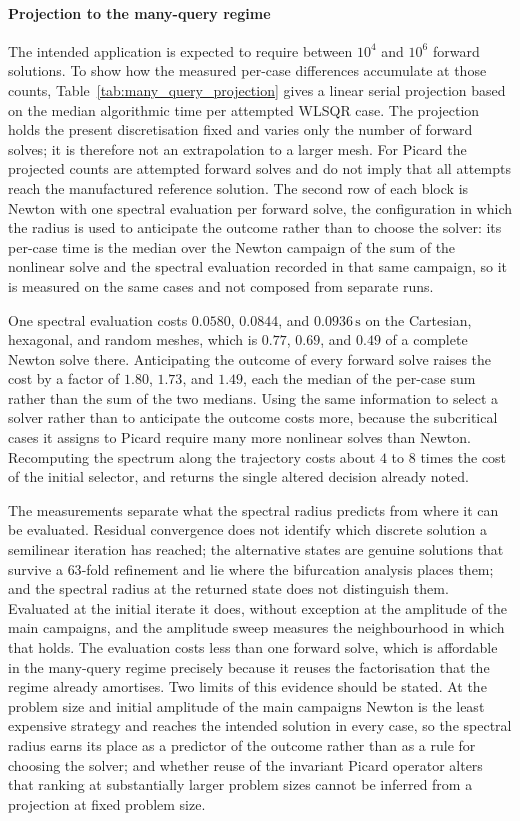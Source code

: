 \paragraph{Projection to the many-query regime}
The intended application is expected to require between $10^{4}$ and $10^{6}$ forward solutions. To show how the measured per-case differences accumulate at those counts, Table~\ref{tab:many_query_projection} gives a linear serial projection based on the median algorithmic time per attempted WLSQR case. The projection holds the present discretisation fixed and varies only the number of forward solves; it is therefore not an extrapolation to a larger mesh. For Picard the projected counts are attempted forward solves and do not imply that all attempts reach the manufactured reference solution. The second row of each block is Newton with one spectral evaluation per forward solve, the configuration in which the radius is used to anticipate the outcome rather than to choose the solver: its per-case time is the median over the Newton campaign of the sum of the nonlinear solve and the spectral evaluation recorded in that same campaign, so it is measured on the same cases and not composed from separate runs.

One spectral evaluation costs $0.0580$, $0.0844$, and $0.0936\,\mathrm{s}$ on the Cartesian, hexagonal, and random meshes, which is $0.77$, $0.69$, and $0.49$ of a complete Newton solve there. Anticipating the outcome of every forward solve raises the cost by a factor of $1.80$, $1.73$, and $1.49$, each the median of the per-case sum rather than the sum of the two medians. Using the same information to select a solver rather than to anticipate the outcome costs more, because the subcritical cases it assigns to Picard require many more nonlinear solves than Newton. Recomputing the spectrum along the trajectory costs about $4$ to $8$ times the cost of the initial selector, and returns the single altered decision already noted.

The measurements separate what the spectral radius predicts from where it can be evaluated. Residual convergence does not identify which discrete solution a semilinear iteration has reached; the alternative states are genuine solutions that survive a $63$-fold refinement and lie where the bifurcation analysis places them; and the spectral radius at the returned state does not distinguish them. Evaluated at the initial iterate it does, without exception at the amplitude of the main campaigns, and the amplitude sweep measures the neighbourhood in which that holds. The evaluation costs less than one forward solve, which is affordable in the many-query regime precisely because it reuses the factorisation that the regime already amortises. Two limits of this evidence should be stated. At the problem size and initial amplitude of the main campaigns Newton is the least expensive strategy and reaches the intended solution in every case, so the spectral radius earns its place as a predictor of the outcome rather than as a rule for choosing the solver; and whether reuse of the invariant Picard operator alters that ranking at substantially larger problem sizes cannot be inferred from a projection at fixed problem size.


